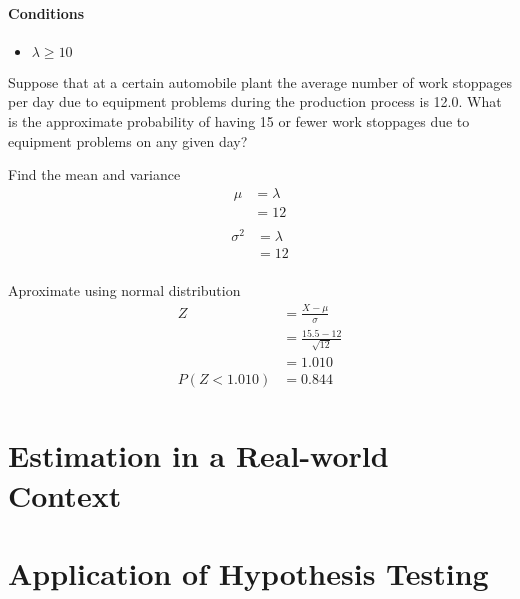         \paragraph{Conditions}
        \begin{itemize}
            \item $\lambda \geq 10$
        \end{itemize}

        \begin{example}
        {
            Suppose that at a certain automobile plant the average number of work stoppages per day due to equipment problems during the production process is 12.0. What is the approximate probability of having 15 or fewer work stoppages due to equipment problems on any given day?
        }

        \begin{step}{Find the mean and variance}
        \begin{align*}
        \mu &= \lambda\\
        &= 12\\
        \end{align*}
        \begin{align*}
        \sigma^2 &= \lambda\\
        &= 12\\
        \end{align*}
        \end{step}

        \begin{step}{Aproximate using normal distribution}
        \begin{align*}
        Z &= \frac{X - \mu}{\sigma} \\
        &=\frac{15.5 - 12}{\sqrt{12}}\\
        &= 1.010\\
        P(Z < 1.010) &= 0.844\\
        \end{align*}
        \end{step}

        \end{example}

\newpage
\section{Estimation in a Real-world Context}



\newpage
\section{Application of Hypothesis Testing}
